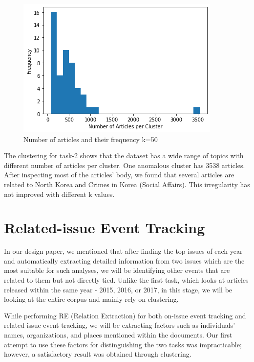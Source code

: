\documentclass[sigconf,authorversion,nonacm]{acmart}
\begin{document}
\begin{figure}[ht]
    \includegraphics[width=0.8\linewidth]{img/image4.png}
    \caption{Number of articles and their frequency k=50}
\end{figure}

The clustering for task-2 shows that the dataset has a wide range of topics with different number of articles per cluster. One anomalous cluster has 3538 articles. After inspecting most of the articles’ body, we found that several articles are related to North Korea and Crimes in Korea (Social Affairs). This irregularity has not improved with different k values. 


\section{Related-issue Event Tracking}
In our design paper, we mentioned that after finding the top issues of each year and automatically extracting detailed information from two issues which are the most suitable for such analyses, we will be identifying other events that are related to them but not directly tied. Unlike the first task, which looks at articles released within the same year - 2015, 2016, or 2017, in this stage, we will be looking at the entire corpus and mainly rely on clustering.

While performing RE (Relation Extraction) for both on-issue event tracking and related-issue event tracking, we will be extracting factors such as individuals’ names, organizations, and places mentioned within the documents. Our first attempt to use these factors for distinguishing the two tasks was impracticable; however, a satisfactory result was obtained through clustering.
\end{document}

